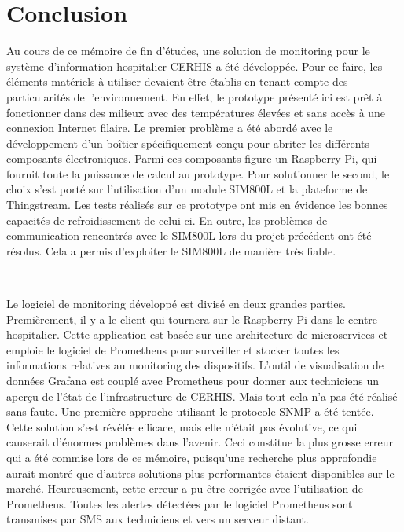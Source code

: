 
\chapter{Conclusion}

\noindent
Au cours de ce mémoire de fin d'études, une solution de monitoring pour le système d'information hospitalier CERHIS a été développée. Pour ce faire, les éléments matériels à utiliser devaient être établis en tenant compte des particularités de l'environnement. En effet, le prototype présenté ici est prêt à fonctionner dans des milieux avec des températures élevées et sans accès à une connexion Internet filaire. Le premier problème a été abordé avec le développement d'un boîtier spécifiquement conçu pour abriter les différents composants électroniques. Parmi ces composants figure un Raspberry Pi, qui fournit toute la puissance de calcul au prototype. Pour solutionner le second, le choix s'est porté sur l'utilisation d'un module SIM800L et la plateforme de Thingstream.  Les tests réalisés sur ce prototype ont mis en évidence les bonnes capacités de refroidissement de celui-ci. En outre, les problèmes de communication rencontrés avec le SIM800L lors du projet précédent ont été résolus. Cela a permis d'exploiter le SIM800L de manière très fiable.

~

\noindent
Le logiciel de monitoring développé est divisé en deux grandes parties. Premièrement, il y a le client qui tournera sur le Raspberry Pi dans le centre hospitalier. Cette application est basée sur une architecture de microservices et emploie le logiciel de Prometheus pour surveiller et stocker toutes les informations relatives au monitoring des dispositifs. L'outil de visualisation de données Grafana est couplé avec Prometheus pour donner aux techniciens un aperçu de l'état de l'infrastructure de CERHIS. Mais tout cela n'a pas été réalisé sans faute. Une première approche utilisant le protocole SNMP a été tentée. Cette solution s'est révélée efficace, mais elle n'était pas évolutive, ce qui causerait d'énormes problèmes dans l'avenir. Ceci constitue la plus grosse erreur qui a été commise lors de ce mémoire, puisqu'une recherche plus approfondie aurait montré que d'autres solutions plus performantes étaient disponibles sur le marché. Heureusement, cette erreur a pu être corrigée avec l'utilisation de Prometheus. Toutes les alertes détectées par le logiciel Prometheus sont transmises par SMS aux techniciens et vers un serveur distant.

~

